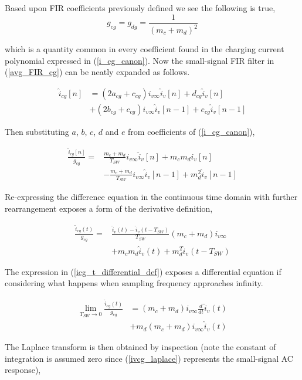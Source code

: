 \documentclass[conference]{IEEEtran}
\begin{document}
Based upon FIR coefficients previously defined we see the following is true,
\begin{equation}
g_{cg} = g_{dg} = \frac{1}{(m_c + m_d)^2}
\end{equation} 

which is a quantity common in every coefficient found in the charging current polynomial expressed in (\ref{i_cg_canon}). Now the small-signal FIR filter in (\ref{avg_FIR_cg}) can be neatly expanded as follows.

\begin{align}
\hat{i}_{cg}[n] & = (2a_{cg}+c_{cg})i_{v\infty} \hat{i}_{v}[n] + d_{cg} \hat{i}_{v}[n] \nonumber \\
& +(2b_{cg}+c_{cg})i_{v\infty} \hat{i}_v[n-1] + e_{cg} \hat{i}_{v}[n-1]
\label{avg_FIR_cg_expanded}
\end{align}

Then substituting $a$, $b$, $c$, $d$ and $e$ from coefficients of (\ref{i_cg_canon}),

\begin{align}
\frac{\hat{i}_{cg}[n]}{g_{cg}} = &\frac{m_c + m_d}{T_{SW}} i_{v\infty} \hat{i}_{v}[n] + m_c m_d \hat{i}_v[n] \nonumber \\ 
&- \frac{m_c + m_d}{T_{SW}} i_{v\infty} \hat{i}_v[n-1] + m_d^2 \hat{i}_v[n-1]
\label{avg_FIR_cg_expanded_coeffs}
\end{align}

Re-expressing the difference equation in the continuous time domain with further rearrangement exposes a form of the derivative definition,

\begin{align}
\frac{\hat{i}_{cg}(t)}{g_{cg}} =&  \frac{\hat{i}_v(t) - \hat{i}_v (t-T_{SW})} {T_{SW}}
(m_c + m_d) i_{v\infty} \nonumber \\
&+	m_c m_d \hat{i}_v(t)
+ m_d^2 \hat{i}_v(t-T_{SW})
\label{icg_t_differential_def}
\end{align}

The expression in (\ref{icg_t_differential_def}) exposes a differential equation if considering what happens when sampling frequency approaches infinity.

\begin{align}
\lim_{T_{SW} \to 0} \frac{\hat{i}_{cg}(t)}{g_{cg}} & = (m_c + m_d) i_{v\infty} \frac{d }{dt} \hat{i}_v(t) \nonumber \\
& + 	m_d( m_c + m_d ) i_{v\infty} \hat{i}_v(t) 
\end{align}

The Laplace transform is then obtained by inspection (note the constant of integration is assumed zero since (\ref{ivcg_laplace}) represents the small-signal AC response),
\end{document}
